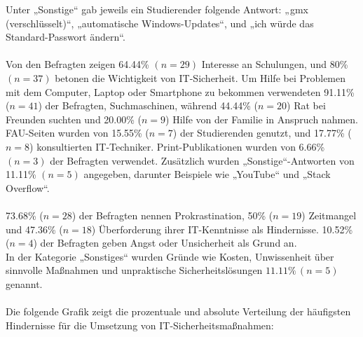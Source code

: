 \documentclass[german,report]{i1thesis}
\begin{document}
Unter „Sonstige“ gab jeweils ein Studierender folgende Antwort: „gmx (verschlüsselt)“, „automatische Windows-Updates“, und „ich würde das Standard-Passwort ändern“.\\
\\
Von den Befragten zeigen 64.44\% \((n = 29)\) Interesse an Schulungen, und 80\% \((n = 37)\) betonen die Wichtigkeit von IT-Sicherheit. Um Hilfe bei Problemen mit dem Computer, Laptop oder Smartphone zu bekommen verwendeten 91.11\% (\(n = 41\)) der Befragten, Suchmaschinen, während 44.44\% (\(n = 20\)) Rat bei Freunden suchten und 20.00\% (\(n = 9\)) Hilfe von der Familie in Anspruch nahmen. FAU-Seiten wurden von 15.55\% (\(n = 7\)) der Studierenden genutzt, und 17.77\% (\(n = 8\)) konsultierten IT-Techniker. Print-Publikationen wurden von 6.66\% \((n = 3)\) der Befragten verwendet. Zusätzlich wurden „Sonstige“-Antworten von 11.11\% \((n = 5)\) angegeben, darunter Beispiele wie „YouTube“ und „Stack Overflow“.\\
\\
73.68\% (\(n = 28\)) der Befragten nennen Prokrastination, 50\% (\(n = 19\)) Zeitmangel und 47.36\% (\(n = 18\)) Überforderung ihrer IT-Kenntnisse als Hindernisse. 10.52\% (\(n = 4\)) der Befragten geben Angst oder Unsicherheit als Grund an.\\
In der Kategorie „Sonstiges“ wurden Gründe wie Kosten, Unwissenheit über sinnvolle Maßnahmen und unpraktische Sicherheitslösungen \(11.11\% \,(n = 5)\) genannt.\\
\\
Die folgende Grafik zeigt die prozentuale und absolute Verteilung der häufigsten Hindernisse für die Umsetzung von IT-Sicherheitsmaßnahmen:
\end{document}
